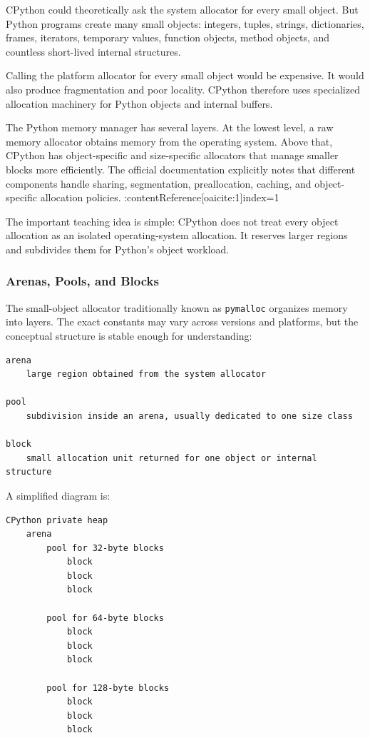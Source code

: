 CPython could theoretically ask the system allocator for every small object. But Python programs create many small objects: integers, tuples, strings, dictionaries, frames, iterators, temporary values, function objects, method objects, and countless short-lived internal structures.

Calling the platform allocator for every small object would be expensive. It would also produce fragmentation and poor locality. CPython therefore uses specialized allocation machinery for Python objects and internal buffers.

The Python memory manager has several layers. At the lowest level, a raw memory allocator obtains memory from the operating system. Above that, CPython has object-specific and size-specific allocators that manage smaller blocks more efficiently. The official documentation explicitly notes that different components handle sharing, segmentation, preallocation, caching, and object-specific allocation policies. :contentReference[oaicite:1]{index=1}

The important teaching idea is simple: CPython does not treat every object allocation as an isolated operating-system allocation. It reserves larger regions and subdivides them for Python's object workload.

\subsubsection*{Arenas, Pools, and Blocks}

The small-object allocator traditionally known as \texttt{pymalloc} organizes memory into layers. The exact constants may vary across versions and platforms, but the conceptual structure is stable enough for understanding:

\begin{verbatim}
arena
    large region obtained from the system allocator

pool
    subdivision inside an arena, usually dedicated to one size class

block
    small allocation unit returned for one object or internal structure
\end{verbatim}

A simplified diagram is:

\begin{verbatim}
CPython private heap
    arena
        pool for 32-byte blocks
            block
            block
            block

        pool for 64-byte blocks
            block
            block
            block

        pool for 128-byte blocks
            block
            block
            block
\end{verbatim}

